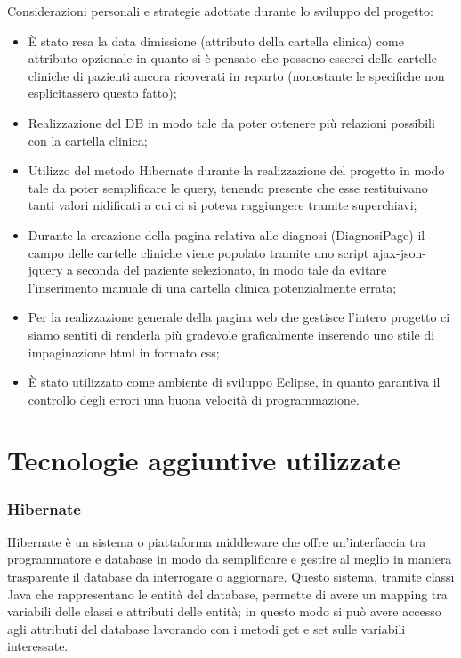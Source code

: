 \documentclass[a4paper,titlepage]{article}
\begin{document}
Considerazioni personali e strategie adottate durante lo sviluppo del progetto:

\begin{itemize}[leftmargin=1.5cm, topsep=0.5cm, itemsep=0.2cm]

\item È stato resa la data dimissione (attributo della cartella clinica) come attributo opzionale in quanto si è pensato che possono esserci delle cartelle cliniche di pazienti ancora ricoverati in reparto (nonostante le specifiche non esplicitassero questo fatto);

\item Realizzazione del DB in modo tale da poter ottenere più relazioni possibili con la cartella clinica;
\item Utilizzo del metodo Hibernate durante la realizzazione del progetto in modo tale da poter semplificare le query, tenendo presente che esse restituivano tanti valori nidificati a cui ci si poteva raggiungere tramite superchiavi;
\item Durante la creazione della pagina relativa alle diagnosi (DiagnosiPage) il campo delle cartelle cliniche viene popolato tramite uno script ajax-json-jquery a seconda del paziente selezionato, in modo tale da evitare l'inserimento manuale di una cartella clinica potenzialmente errata;
\item Per la realizzazione generale della pagina web che gestisce l'intero progetto ci siamo sentiti di renderla più gradevole graficalmente inserendo uno stile di impaginazione html in formato css;
\item È stato utilizzato come ambiente di sviluppo Eclipse, in quanto garantiva il controllo degli errori una buona velocità di programmazione.

\end{itemize}


\part{Tecnologie aggiuntive utilizzate}

\section{Hibernate}

Hibernate è un sistema o piattaforma middleware che offre un'interfaccia tra programmatore e database in modo da semplificare e gestire al meglio in maniera trasparente il database da interrogare o aggiornare. Questo sistema, tramite classi Java che rappresentano le entità del database, permette di avere un mapping tra variabili delle classi e attributi delle entità; in questo modo si può avere accesso agli attributi del database lavorando con i metodi get e set sulle variabili interessate.
\end{document}
